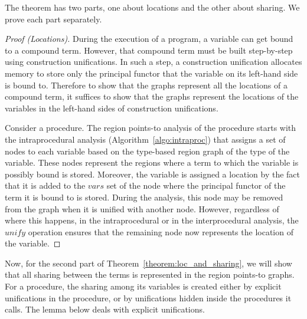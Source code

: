 \documentclass{tlp}
\def\varset{\mathit{vars}}
\begin{document}
The theorem has two parts, one about locations and the other about sharing.
We prove each part separately.
\begin{proof}[Proof (Locations)]
During the execution of a program,
a variable can get bound to a compound term.
However, that compound term must be built step-by-step
using construction unifications.
In such a step, a construction unification allocates memory
to store only the principal functor that
the variable on its left-hand side is bound to.
Therefore to show that the graphs represent
all the locations of a compound term,
it suffices to show that the graphs represent the locations
of the variables in the left-hand sides of construction unifications.

Consider a procedure.
The region points-to analysis of the procedure starts with
the intraprocedural analysis (Algorithm~\ref{algo:intraproc}) that
assigns a set of nodes to each variable based on
the type-based region graph of the type of the variable.
These nodes represent the regions where
a term to which the variable is possibly bound is stored.
Moreover, the variable is assigned a location by the fact that
it is added to the $\varset$ set of the node
where the principal functor of the term it is bound to is stored.
During the analysis, this node may be removed from the graph
when it is unified with another node.
However, regardless of where this happens,
in the intraprocedural or in the interprocedural analysis,
the $\mathit{unify}$ operation ensures that
the remaining node now represents the location of the variable.
\end{proof}

Now, for the second part of Theorem~\ref{theorem:loc_and_sharing},
we will show that
all sharing between the terms is represented in the region points-to graphs.
For a procedure, the sharing among its variables is created
either by explicit unifications in the procedure,
or by unifications hidden inside the procedures it calls.
The lemma below deals with explicit unifications.
\end{document}
